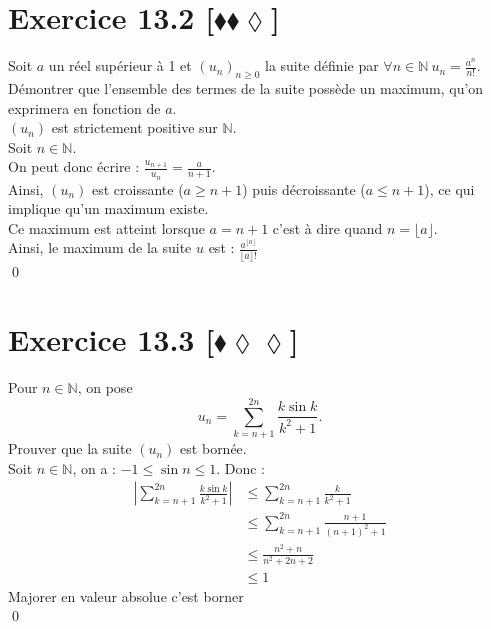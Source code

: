 \documentclass[10pt]{article}
\begin{document}
\section*{Exercice 13.2 [$\blacklozenge\blacklozenge\lozenge$]}
\begin{tcolorbox}[enhanced, width=7.6in, center, size=fbox, fontupper=\large, drop shadow southwest]
    Soit $a$ un réel supérieur à 1 et $(u_n)_{n\geq0}$ la suite définie par $\forall n \in \mathbb{N} ~ u_n = \frac{a^n}{n!}$.\\
    Démontrer que l'ensemble des termes de la suite possède un maximum, qu'on exprimera en fonction de $a$.\\
    $(u_n)$ est strictement positive sur $\mathbb{N}$.\\
    Soit $n \in \mathbb{N}$.\\
    On peut donc écrire : $\frac{u_{n+1}}{u_n}=\frac{a}{n+1}$.\\
    Ainsi, $(u_n)$ est croissante ($a\geq n+1$) puis décroissante ($a\leq n+1$), ce qui implique qu'un maximum existe.\\
    Ce maximum est atteint lorsque $a=n+1$ c'est à dire quand $n=\lfloor a \rfloor$.\\
    Ainsi, le maximum de la suite $u$ est : $\frac{a^{\lfloor a \rfloor}}{\lfloor a \rfloor!}$\\
    \qed
\end{tcolorbox}


\section*{Exercice 13.3 [$\blacklozenge\lozenge\lozenge$]}
\begin{tcolorbox}[enhanced, width=7.6in, center, size=fbox, fontupper=\large, drop shadow southwest]
    Pour $n\in\mathbb{N}$, on pose
    \begin{equation*}
        u_n = \sum_{k=n+1}^{2n}\frac{k\sin k}{k^2+1}.
    \end{equation*}
    Prouver que la suite $(u_n)$ est bornée.\\
    Soit $n\in\mathbb{N}$, on a : $-1 \leq \sin n \leq 1$. Donc :
    \begin{align*}
        \left|\sum_{k=n+1}^{2n}\frac{k\sin k}{k^2+1}\right| &\leq \sum_{k=n+1}^{2n}\frac{k}{k^2+1}\\
        &\leq \sum_{k=n+1}^{2n}\frac{n+1}{(n+1)^2+1}\\
        &\leq \frac{n^2 + n}{n^2 + 2n + 2}\\
        &\leq 1
    \end{align*}
    Majorer en valeur absolue c'est borner\\
    \qed
\end{tcolorbox}
\end{document}
